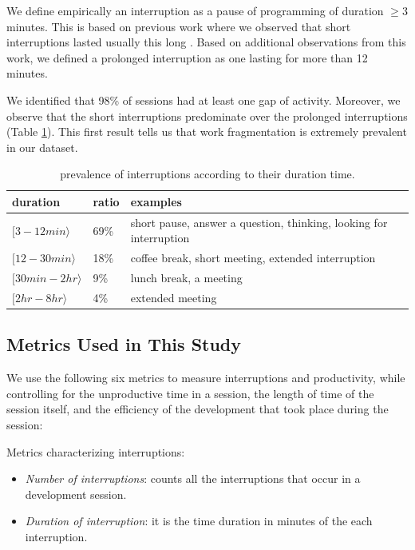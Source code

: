 \documentclass[times]{smrauth}
\begin{document}
We define empirically an interruption as a pause of programming of duration $\geq 3$ minutes. This is based on previous work where we observed that short interruptions lasted usually this long \cite{GM04}. Based on additional observations from this work, we defined a prolonged interruption as one lasting for more than 12 minutes. 

We identified that 98\% of sessions had at least one gap of activity. Moreover, we observe that the short interruptions predominate over the prolonged interruptions (Table \ref{tbl:by_duration}). This first result tells us that work fragmentation is extremely prevalent in our dataset.

\begin{table}[ht!]
\renewcommand{\arraystretch}{1.3}
\caption{prevalence of interruptions according to their duration time. }
\label{tbl:by_duration}
\centering
\begin{tabular}{p{3cm}|p{0.8cm}|p{4cm}} 
duration & ratio & examples  \\
  \hline   
$[3  - 12 min \rangle$ & 69\% & short pause, answer a question, thinking, looking for interruption  \\ 
\hline 
$[12  - 30 min \rangle$ & 18\% & coffee break, short meeting, extended interruption  \\
$[30 min - 2 hr \rangle$  & 9\% & lunch break, a meeting  \\
$[2 hr - 8 hr \rangle$ & 4\% & extended meeting \\
\end{tabular}
\end{table}

\subsection{Metrics Used in This Study}
We use the following six metrics to measure interruptions and productivity, while controlling for the unproductive time in a session, the length of time of the session itself, and the efficiency of the development that took place during the session:

Metrics characterizing interruptions:
	\begin{itemize}
	 \item \textit{Number of interruptions}:  counts all the interruptions that occur in a development session.
	 \item \textit{Duration of interruption}:  it is the time duration in minutes of the each interruption. 
	\end{itemize}
\end{document}
